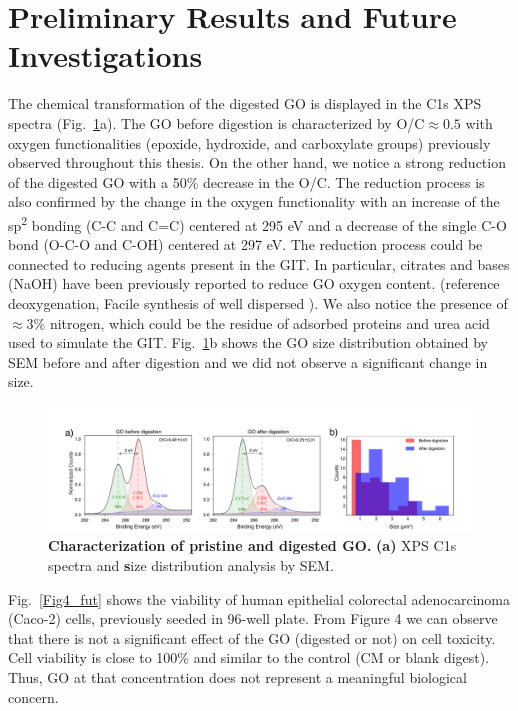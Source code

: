 \section{Preliminary Results and Future Investigations}
The chemical transformation of the digested GO is displayed in the C1s XPS spectra (Fig.~\ref{Fig3_fut}a). The GO before digestion is characterized by O/C$\approx0.5$ with oxygen functionalities (epoxide, hydroxide, and carboxylate groups) previously observed throughout this thesis. On the other hand, we notice a strong reduction of the digested GO with a 50\% decrease in the O/C. The reduction process is also confirmed by the change in the oxygen functionality with an increase of the sp\textsuperscript{2} bonding (C-C and C=C) centered at 295 eV and a decrease of the single C-O bond (O-C-O and C-OH) centered at 297 eV. The reduction process could be connected to reducing agents present in the GIT. In particular, citrates and bases (NaOH) have been previously reported to reduce GO oxygen content. (reference deoxygenation, Facile synthesis of well dispersed ). We also notice the presence of $\approx3$\% nitrogen, which could be the residue of adsorbed proteins and urea acid used to simulate the GIT. Fig.~\ref{Fig3_fut}b shows the GO size distribution obtained by SEM before and after digestion and we did not observe a significant change in size.
\begin{figure}[h]
  \centering
  \includegraphics[width=6.5in]{future/Fig3.pdf}
  \caption{\textbf{Characterization of pristine and digested GO.} \textbf{(a)} XPS C1s spectra and \textbf size distribution analysis by SEM.}
  \label{Fig3_fut}
\end{figure}

Fig.~\ref{Fig4_fut} shows the viability of human epithelial colorectal adenocarcinoma (Caco-2) cells, previously seeded in 96-well plate. From Figure 4 we can observe that there is not a significant effect of the GO (digested or not) on cell toxicity. Cell viability is close to 100\% and similar to the control (CM or blank digest). Thus, GO at that concentration does not represent a meaningful biological concern.\\

